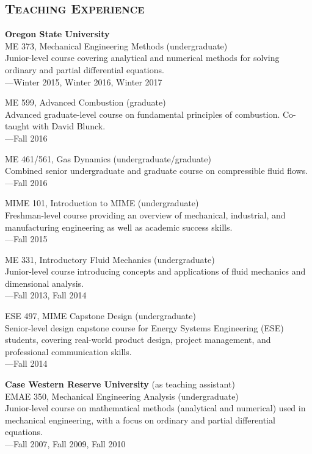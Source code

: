 \documentclass[margin,line,11pt]{res}
\begin{document}
\begin{resume}
\section{\textsc{Teaching Experience}}

\textbf{Oregon State University} \\
ME 373, Mechanical Engineering Methods (undergraduate) \\
Junior-level course covering analytical and numerical methods for solving ordinary and partial differential equations. \\
---Winter 2015, Winter 2016, Winter 2017

ME 599, Advanced Combustion (graduate) \\
Advanced graduate-level course on fundamental principles of combustion. Co-taught with David Blunck.\\
---Fall 2016

ME 461\slash 561, Gas Dynamics (undergraduate\slash graduate) \\
Combined senior undergraduate and graduate course on compressible fluid flows. \\
---Fall 2016

MIME 101, Introduction to MIME (undergraduate) \\
Freshman-level course providing an overview of mechanical, industrial, and manufacturing engineering as well as academic success skills. \\
---Fall 2015

ME 331, Introductory Fluid Mechanics (undergraduate) \\
Junior-level course introducing concepts and applications of fluid mechanics and dimensional analysis. \\
---Fall 2013, Fall 2014

ESE 497, MIME Capstone Design (undergraduate) \\
Senior-level design capstone course for Energy Systems Engineering (ESE) students, covering real-world product design, project management, and professional communication skills. \\
---Fall 2014

\textbf{Case Western Reserve University} (as teaching assistant) \\
EMAE 350, Mechanical Engineering Analysis (undergraduate) \\
Junior-level course on mathematical methods (analytical and numerical) used in mechanical engineering, with a focus on ordinary and partial differential equations. \\
---Fall 2007, Fall 2009, Fall 2010


\end{resume}
\end{document}
